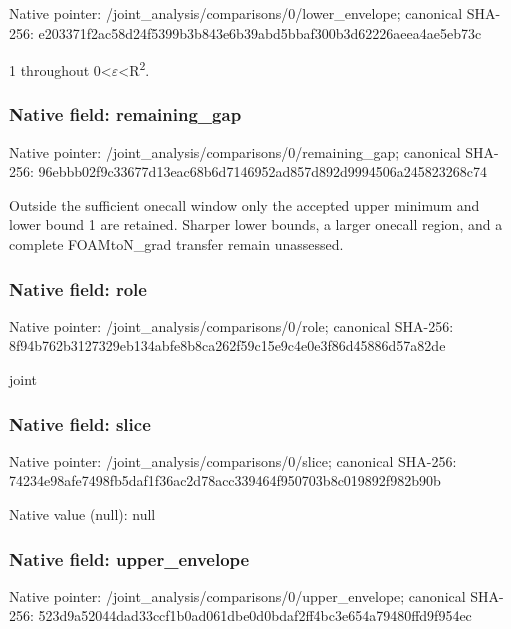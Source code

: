 \documentclass[10pt,a4paper]{article}
\begin{document}
Native pointer: /joint\_analysis/comparis\allowbreak{}ons/0/lower\_envelope; canonical SHA-256: e203371f2ac58d24f5399b3b\allowbreak{}843e6b39abd5bbaf300b3d62\allowbreak{}226aeea4ae5eb73c


1 throughout 0<\ensuremath{\varepsilon}<R\textsuperscript{2}.


\subsubsection{Native field: remaining\_gap}


Native pointer: /joint\_analysis/comparis\allowbreak{}ons/0/remaining\_gap; canonical SHA-256: 96ebbb02f9c33677d13eac68\allowbreak{}b6d7146952ad857d892d9994\allowbreak{}506a245823268c74


Outside the sufficient onecall window only the accepted upper minimum and lower bound 1 are retained. Sharper lower bounds, a larger onecall region, and a complete FOAMtoN\_grad transfer remain unassessed.


\subsubsection{Native field: role}


Native pointer: /joint\_analysis/comparisons/0/role; canonical SHA-256: 8f94b762b3127329eb134abf\allowbreak{}e8b8ca262f59c15e9c4e0e3f\allowbreak{}86d45886d57a82de


joint


\subsubsection{Native field: slice}


Native pointer: /joint\_analysis/comparisons/0/slice; canonical SHA-256: 74234e98afe7498fb5daf1f3\allowbreak{}6ac2d78acc339464f950703b\allowbreak{}8c019892f982b90b



Native value (null): null



\subsubsection{Native field: upper\_envelope}


Native pointer: /joint\_analysis/comparis\allowbreak{}ons/0/upper\_envelope; canonical SHA-256: 523d9a52044dad33ccf1b0ad\allowbreak{}061dbe0d0bdaf2ff4bc3e654\allowbreak{}a79480ffd9f954ec
\end{document}
